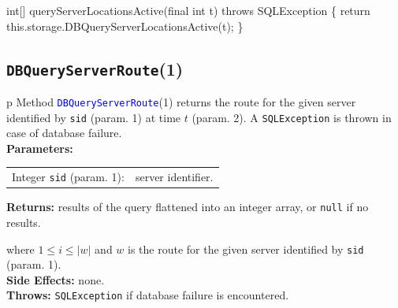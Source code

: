 \nwenddocs{}\endmoddef{}
int[] queryServerLocationsActive(final int t) throws SQLException \{
  return this.storage.DBQueryServerLocationsActive(t);
\}
\eatline
{}\nwendcode{}\nwdocspar
\subsection{{\tt{}\protect{}DBQueryServerRoute}(1)}
\begin{tabular}{p{\textwidth}}
\toprule
{}
Method \textcolor{blue}{{\tt{}\protect{}DBQueryServerRoute}}(1) returns the route for the
given server identified by {\tt{}sid} (param. 1) at time $t$ (param. 2).
A {\tt{}SQLException} is thrown in case of database failure.\\
\midrule
\textbf{Parameters:} \\
\begin{tabular}{lp{116mm}}
Integer {\tt{}sid} (param. 1):&server identifier.\\
\end{tabular}
\textbf{Returns:} results of the query flattened into an integer array,
or {\tt{}null} if no results.


where $1\leq i\leq |w|$ and $w$ is the route for the given server
identified by {\tt{}sid} (param. 1).\\
\textbf{Side Effects:} none.\\
\textbf{Throws:} {\tt{}SQLException} if database failure is encountered.\\
\bottomrule
\end{tabular}
